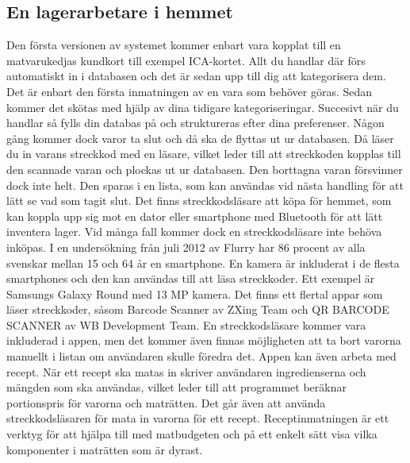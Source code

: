 \documentclass[12pt, a4paper]{article}
\begin{document}
\subsection{En lagerarbetare i hemmet}
Den första versionen av systemet kommer enbart vara kopplat till en matvarukedjas kundkort till exempel ICA-kortet. Allt du handlar där förs automatiskt in i databasen och det är sedan upp till dig att kategorisera dem. Det är enbart den första inmatningen av en vara som behöver göras. Sedan kommer det skötas med hjälp av dina tidigare kategoriseringar. Succesivt när du handlar så fylls din databas på och struktureras efter dina preferenser. 
\noindent \newline \newline
Någon gång kommer dock varor ta slut och då ska de flyttas ut ur databasen. Då läser du in varans streckkod med en läsare, vilket leder till att streckkoden kopplas till den scannade varan och plockas ut ur databasen. Den borttagna varan försvinner dock inte helt. Den sparas i en lista, som kan användas vid nästa handling för att lätt se vad som tagit slut.
\noindent \newline \newline
Det finns streckkodsläsare att köpa för hemmet, som kan koppla upp sig mot en dator eller smartphone med Bluetooth för att lätt inventera lager.\cite{Mynewsdesk} Vid många fall kommer dock en streckkodsläsare inte behöva inköpas. I en undersökning från juli 2012 av Flurry har 86 procent av alla svenskar mellan 15 och 64 år en smartphone.\cite{Flurry} En kamera är inkluderat i de flesta smartphones och den kan användas till att läsa streckkoder. Ett exempel är Samsungs Galaxy Round med 13 MP kamera.\cite{NyTeknik} Det finns ett flertal appar som läser streckkoder, såsom Barcode Scanner av ZXing Team och QR BARCODE SCANNER av WB Development Team.\cite{BarcodeScanner, QRBarcodeScanner} 
\noindent \newline \newline
En streckkodsläsare kommer vara inkluderad i appen, men det kommer även finnas möjligheten att ta bort varorna manuellt i listan om användaren skulle föredra det.             
\noindent \newline \newline
Appen kan även arbeta med recept. När ett recept ska matas in skriver användaren ingredienserna och mängden som ska användas, vilket leder till att programmet beräknar portionspris för varorna och maträtten. Det går även att använda streckkodsläsaren för mata in varorna för ett recept. Receptinmatningen är ett verktyg för att hjälpa till med matbudgeten och på ett enkelt sätt visa vilka komponenter i maträtten som är dyrast.        
\end{document}
